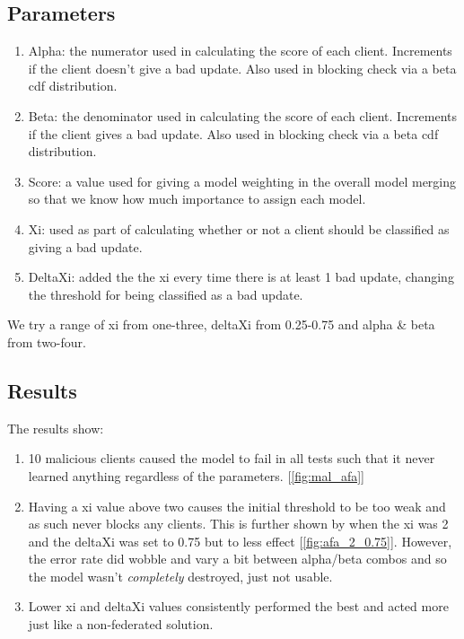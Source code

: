 \subsection{Parameters}
\begin{enumerate}
    \item Alpha: the numerator used in calculating the score of each client. Increments if the client doesn't give a bad update. Also used in blocking check via a beta cdf distribution.
    \item Beta: the denominator used in calculating the score of each client. Increments if the client gives a bad update. Also used in blocking check via a beta cdf distribution.
    \item Score: a value used for giving a model weighting in the overall model merging so that we know how much importance to assign each model.
    \item Xi: used as part of calculating whether or not a client should be classified as giving a bad update.
    \item DeltaXi: added the the xi every time there is at least 1 bad update, changing the threshold for being classified as a bad update.
\end{enumerate}
We try a range of xi from one-three, deltaXi from 0.25-0.75 and alpha \& beta from two-four.

\subsection{Results}
The results show:
\begin{enumerate}
    \item 10 malicious clients caused the model to fail in all tests such that it never learned anything regardless of the parameters. [\ref{fig:mal_afa}]
    \item Having a xi value above two causes the initial threshold to be too weak and as such never blocks any clients. This is further shown by when the xi was 2 and the deltaXi was set to 0.75 but to less effect [\ref{fig:afa_2_0.75}]. 
    However, the error rate did wobble and vary a bit between alpha/beta combos and so the model wasn't \textit{completely} destroyed, just not usable.
    \item Lower xi and deltaXi values consistently performed the best and acted more just like a non-federated solution.
\end{enumerate}

